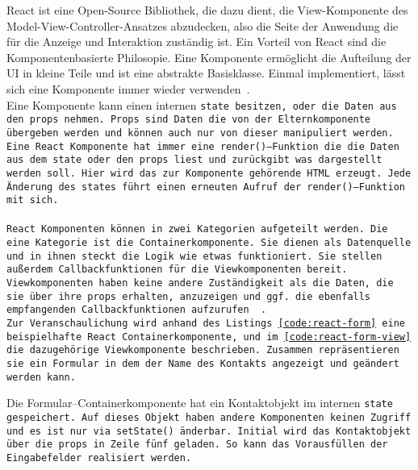 React ist eine Open-Source Bibliothek, die dazu dient, die View-Komponente des Model-View-Controller-Ansatzes abzudecken, also die Seite der Anwendung die für die Anzeige und Interaktion zuständig ist. Ein Vorteil von React sind die Komponentenbasierte Philosopie. Eine Komponente ermöglicht die Aufteilung der \gls{UI} in kleine Teile und ist eine abstrakte Basisklasse. Einmal implementiert, lässt sich eine Komponente immer wieder verwenden~\cite{react}.\\
Eine Komponente kann einen internen \tt{state} besitzen, oder die Daten aus den \tt{props} nehmen.
\tt{Props} sind Daten die von der Elternkomponente übergeben werden und können auch nur von dieser manipuliert werden.
Eine React Komponente hat immer eine \tt{render()}--Funktion die die Daten aus dem \tt{state} oder den \tt{props} liest und zurückgibt was dargestellt werden soll.
Hier wird das zur Komponente gehörende \gls{HTML} erzeugt. Jede Änderung des \tt{states} führt einen erneuten Aufruf der \tt{render()}--Funktion mit sich.\\\\
React Komponenten können in zwei Kategorien aufgeteilt werden. Die eine Kategorie ist die Containerkomponente. Sie dienen als Datenquelle und in ihnen steckt die Logik wie etwas funktioniert. Sie stellen außerdem Callbackfunktionen für die Viewkomponenten bereit.
Viewkomponenten haben keine andere Zuständigkeit als die Daten, die sie über ihre \tt{props} erhalten, anzuzeigen und ggf. die ebenfalls empfangenden Callbackfunktionen aufzurufen ~\cite{react-components}.\\
Zur Veranschaulichung wird anhand des Listings \ref{code:react-form} eine beispielhafte React Containerkomponente, und im \autoref{code:react-form-view} die dazugehörige Viewkomponente beschrieben.
Zusammen repräsentieren sie ein Formular in dem der Name des Kontakts angezeigt und geändert werden kann.
%
\begin{center}
  
\end{center}
%
Die Formular--Containerkomponente hat ein Kontaktobjekt im internen \tt{state} gespeichert.
Auf dieses Objekt haben andere Komponenten keinen Zugriff und es ist nur via \tt{setState()} änderbar.
Initial wird das Kontaktobjekt über die \tt{props} in Zeile fünf geladen. So kann das Vorausfüllen der Eingabefelder realisiert werden.\\
